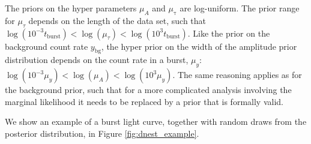 \documentclass[12pt]{emulateapj}
\newcommand{\given}{\,|\,}
\newcommand{\counts}{y}
\newcommand{\pars}{\theta}
\newcommand{\mean}{\lambda}
\newcommand{\Poisson}{{\mathcal P}}
\newcommand{\bg}{\mathrm{bg}}
\begin{document}
The priors on the hyper parameters $\mu_{A}$ and $\mu_{\mathrm{\tau}}$ are log-uniform. The prior range for
$\mu_{\tau}$ depends on the length of the data set, such that $\log{(10^{-3}t_{\mathrm{burst}})} < \log{(\mu_{\tau})} < \log{(10^{3}t_\mathrm{burst})}$.
Like the prior on the background count rate $\counts_{\mathrm{bg}}$, the hyper prior on the width of the amplitude prior distribution
depends on the count rate in a burst, $\mu_\counts$: $\log{(10^{-3}\mu_\counts)} < \log{(\mu_{A})} < \log{(10^{3} \mu_\counts)}$. The same reasoning applies as
for the background prior, such that for a more complicated analysis involving the marginal likelihood it needs to be replaced
by a prior that is formally valid.

We show an example of a burst light curve, together with random draws from the posterior distribution, in Figure \ref{fig:dnest_example}.



  
 





\end{document}
